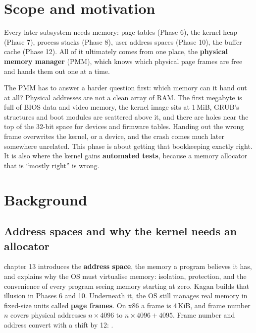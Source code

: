 \documentclass[11pt,a4paper]{article}
\begin{document}


\section{Scope and motivation}

Every later subsystem needs memory: page tables (Phase 6), the kernel heap (Phase 7), process stacks (Phase 8), user
address spaces (Phase 10), the buffer cache (Phase 12). All of it ultimately comes from one place, the
\textbf{physical memory manager} (PMM), which knows which physical page frames are free and hands them out one at a
time.

The PMM has to answer a harder question first: which memory can it hand out at all? Physical addresses are not a
clean array of RAM. The first megabyte is full of BIOS data and video memory, the kernel image sits at 1\,MiB,
GRUB's structures and boot modules are scattered above it, and there are holes near the top of the 32-bit space for
devices and firmware tables. Handing out the wrong frame overwrites the kernel, or a device, and the crash
comes much later somewhere unrelated. This phase is about getting that bookkeeping exactly right. It is also
where the kernel gains \textbf{automated tests}, because a memory allocator that is ``mostly right'' is wrong.

\section{Background}

\subsection{Address spaces and why the kernel needs an allocator}

\OSTEP chapter 13 introduces the \textbf{address space}, the memory a program believes it has, and explains why the
OS must virtualise memory: isolation, protection, and the convenience of every program seeing memory starting at
zero. Kagan builds that illusion in Phases 6 and 10. Underneath it, the OS still manages real memory in fixed-size
units called \textbf{page frames}. On x86 a frame is 4\,KiB, and frame number $n$ covers physical addresses
$n \times 4096$ to $n \times 4096 + 4095$. Frame number and address convert with a shift by 12: .
\end{document}
